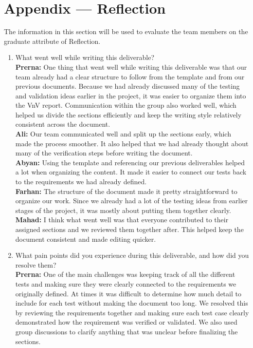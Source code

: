 \documentclass[12pt, titlepage]{article}
\begin{document}



\newpage
\section*{Appendix --- Reflection}

The information in this section will be used to evaluate the team members on the
graduate attribute of Reflection.



\begin{enumerate}
  \item What went well while writing this deliverable?\\
  \textbf{Prerna:} One thing that went well while writing this deliverable was that our team already had a clear structure to follow from the template and from our previous documents. Because we had already discussed many of the testing and validation ideas earlier in the project, it was easier to organize them into the VnV report. Communication within the group also worked well, which helped us divide the sections efficiently and keep the writing style relatively consistent across the document. \\
  \textbf{Ali:} Our team communicated well and split up the sections early, which made the process smoother. It also helped that we had already thought about many of the verification steps before writing the document. \\
  \textbf{Abyan:} Using the template and referencing our previous deliverables helped a lot when organizing the content. It made it easier to connect our tests back to the requirements we had already defined.\\
  \textbf{Farhan:} The structure of the document made it pretty straightforward to organize our work. Since we already had a lot of the testing ideas from earlier stages of the project, it was mostly about putting them together clearly.\\
  \textbf{Mahad:} I think what went well was that everyone contributed to their assigned sections and we reviewed them together after. This helped keep the document consistent and made editing quicker. \\
  \item What pain points did you experience during this deliverable, and how did you resolve them?\\
  \textbf{Prerna:} One of the main challenges was keeping track of all the different tests and making sure they were clearly connected to the requirements we originally defined. At times it was difficult to determine how much detail to include for each test without making the document too long. We resolved this by reviewing the requirements together and making sure each test case clearly demonstrated how the requirement was verified or validated. We also used group discussions to clarify anything that was unclear before finalizing the sections.\\

\end{enumerate}
\end{document}
